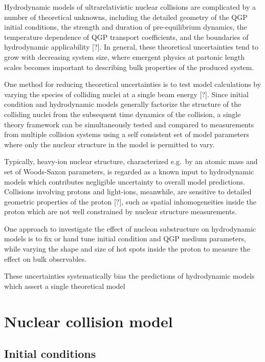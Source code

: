 \documentclass[aps,prc,reprint,amsmath,nofootinbib]{revtex4-1}
\newcommand{\note}{\textcolor{theblue}{[?]}}
\begin{document}
  Hydrodynamic models of ultrarelativistic nuclear collisions are complicated by a number of theoretical unknowns, including the detailed geometry of the QGP initial conditions, the strength and duration of pre-equilibrium dynamics, the temperature dependence of QGP transport coefficients, and the boundaries of hydrodynamic applicability \note.
In general, these theoretical uncertainties tend to grow with decreasing system size, where emergent physics at partonic length scales becomes important to describing bulk properties of the produced system.

  One method for reducing theoretical uncertainties is to test model calculations by varying the species of colliding nuclei at a single beam energy \note.
Since initial condition and hydrodynamic models generally factorize the structure of the colliding nuclei from the subsequent time dynamics of the collision, a single theory framework can be simultaneously tested and compared to measurements from multiple collision systems using a self consistent set of model parameters where only the nuclear structure in the model is permitted to vary.

  Typically, heavy-ion nuclear structure, characterized e.g.\ by an atomic mass and set of Woods-Saxon parameters, is regarded as a known input to hydrodynamic models which contributes negligible uncertainty to overall model predictions.
Collisions involving protons and light-ions, meanwhile, are sensitive to detailed geometric properties of the proton \note, such as spatial inhomogeneities inside the proton which are not well constrained by nuclear structure measurements.

One approach to investigate the effect of nucleon substructure on hydrodynamic models is to fix or hand tune initial condition and QGP medium parameters, while varying the shape and size of hot spots inside the proton to measure the effect on bulk observables.

These uncertainties systematically bias the predictions of hydrodynamic models which assert a single theoretical model 

\section{Nuclear collision model}


\subsection{Initial conditions}
\end{document}
